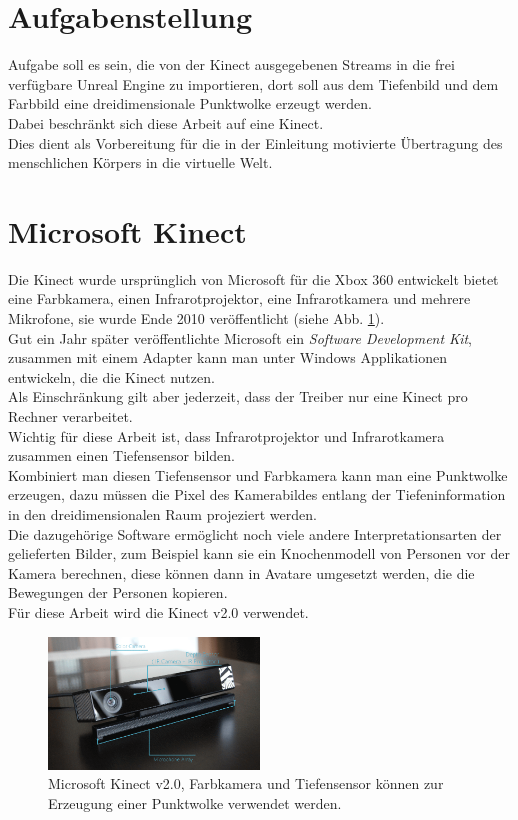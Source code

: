 \documentclass[a4paper]{IEEEtran}
\begin{document}
\section{Aufgabenstellung}
	Aufgabe soll es sein, die von der Kinect ausgegebenen Streams in die frei verfügbare Unreal Engine zu importieren, dort soll aus dem Tiefenbild und dem Farbbild eine dreidimensionale Punktwolke erzeugt werden. \\
	Dabei beschränkt sich diese Arbeit auf eine Kinect. \\
	Dies dient als Vorbereitung für die in der Einleitung motivierte Übertragung des menschlichen Körpers in die virtuelle Welt. \\


\section{Microsoft Kinect}
	Die Kinect wurde ursprünglich von Microsoft für die Xbox 360 entwickelt bietet eine Farbkamera, einen Infrarotprojektor, eine Infrarotkamera und mehrere Mikrofone, sie wurde Ende 2010 veröffentlicht (siehe Abb. \ref{Kinectv2}). \\
	Gut ein Jahr später veröffentlichte Microsoft ein \textit{Software Development Kit}, zusammen mit einem Adapter kann man unter Windows Applikationen entwickeln, die die Kinect nutzen.\\
	Als Einschränkung gilt aber jederzeit, dass der Treiber nur eine Kinect pro Rechner verarbeitet.\\
	Wichtig für diese Arbeit ist, dass Infrarotprojektor und Infrarotkamera zusammen einen Tiefensensor bilden. \\
	Kombiniert man diesen Tiefensensor und Farbkamera kann man eine Punktwolke erzeugen, dazu müssen die Pixel des Kamerabildes entlang der Tiefeninformation in den dreidimensionalen Raum projeziert werden. \\
	Die dazugehörige Software ermöglicht noch viele andere Interpretationsarten der gelieferten Bilder, zum Beispiel kann sie ein Knochenmodell von Personen vor der Kamera berechnen, diese können dann in Avatare umgesetzt werden, die die Bewegungen der Personen kopieren.\\
	Für diese Arbeit wird die Kinect v2.0 verwendet. \\[0.5cm]
	
	\begin{figure}[!h]
    	\centering
		\includegraphics[width=0.5\textwidth]{img/Kinectv2}
	    \caption{Microsoft Kinect v2.0, Farbkamera und Tiefensensor können zur Erzeugung einer Punktwolke verwendet werden.}
    	\label{Kinectv2}
	\end{figure}
	
\end{document}
